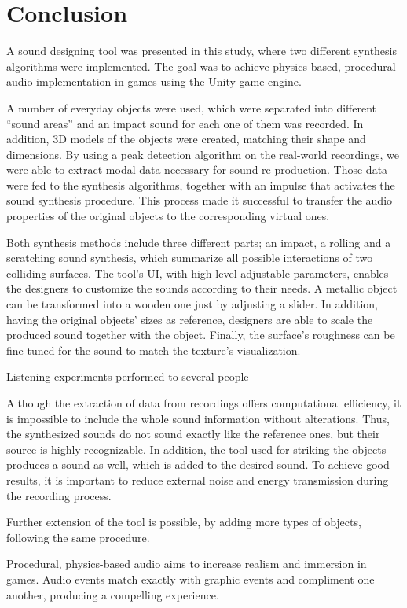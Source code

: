\chapter{Conclusion}

A sound designing tool was presented in this study, where two different synthesis algorithms were implemented. The goal was to achieve physics-based, procedural audio implementation in games using the Unity\textsuperscript{\textregistered} game engine. 

A number of everyday objects were used, which were separated into different ``sound areas'' and an impact sound for each one of them was recorded. In addition, 3D models of the objects were created, matching their shape and dimensions. By using a peak detection algorithm on the real-world recordings, we were able to extract modal data necessary for sound re-production. Those data were fed to the synthesis algorithms, together with an impulse that activates the sound synthesis procedure. This process made it successful to transfer the audio properties of the original objects to the corresponding virtual ones.

Both synthesis methods include three different parts; an impact, a rolling and a scratching sound synthesis, which summarize all possible interactions of two colliding surfaces. The tool's \gls{UI}, with high level adjustable parameters, enables the designers to customize the sounds according to their needs. A metallic object can be transformed into a wooden one just by adjusting a slider. In addition, having the original objects' sizes as reference, designers are able to scale the produced sound together with the object. Finally, the surface's roughness can be fine-tuned for the sound to match the texture's visualization.

Listening experiments performed to several people 

Although the extraction of data from recordings offers computational efficiency, it is impossible to include the whole sound information without alterations. Thus, the synthesized sounds do not sound exactly like the reference ones, but their source is highly recognizable. In addition, the tool used for striking the objects produces a sound as well, which is added to the desired sound. To achieve good results, it is important to reduce external noise and energy transmission during the recording process.

Further extension of the tool is possible, by adding more types of objects, following the same procedure.

Procedural, physics-based audio aims to increase realism and immersion in games. Audio events match exactly with graphic events and compliment one another, producing a compelling experience.